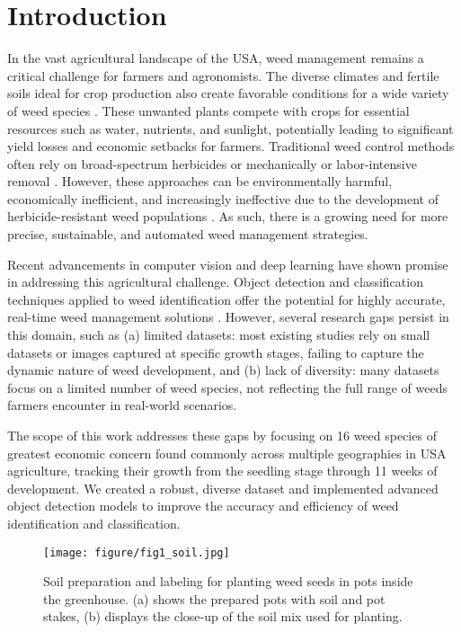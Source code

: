 \section{Introduction}
In the vast agricultural landscape of the USA, weed management remains a critical challenge for farmers and agronomists. The diverse climates and fertile soils ideal for crop production also create favorable conditions for a wide variety of weed species \cite{monteiro2022sustainable}. These unwanted plants compete with crops for essential resources such as water, nutrients, and sunlight, potentially leading to significant yield losses and economic setbacks for farmers. Traditional weed control methods often rely on broad-spectrum herbicides or mechanically or labor-intensive removal \cite{ren2024exploring}. However, these approaches can be environmentally harmful, economically inefficient, and increasingly ineffective due to the development of herbicide-resistant weed populations \cite{Gao2024-km}. As such, there is a growing need for more precise, sustainable, and automated weed management strategies.

Recent advancements in computer vision and deep learning have shown promise in addressing this agricultural challenge. Object detection and classification techniques applied to weed identification offer the potential for highly accurate, real-time weed management solutions \cite{Almalky2023-ot}. However, several research gaps persist in this domain, such as (a) limited datasets: most existing studies rely on small datasets or images captured at specific growth stages, failing to capture the dynamic nature of weed development, and (b) lack of diversity: many datasets focus on a limited number of weed species, not reflecting the full range of weeds farmers encounter in real-world scenarios.

The scope of this work addresses these gaps by focusing on 16 weed species of greatest economic concern found commonly across multiple geographies in USA agriculture, tracking their growth from the seedling stage through 11 weeks of development. We created a robust, diverse dataset and implemented advanced object detection models to improve the accuracy and efficiency of weed identification and classification.



\begin{figure}[t]
    \centering
\texttt{[image: figure/fig1\_soil.jpg]}
    \vspace{-0.4cm}
    \caption{Soil preparation and labeling for planting weed seeds in pots inside the greenhouse. (a) shows the prepared pots with soil and pot stakes, (b) displays the close-up of the soil mix used for planting.}
    \label{fig:fig1}
    \vspace{-0.3cm}
\end{figure}

